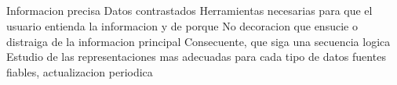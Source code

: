 \subsection*{}
Informacion precisa
Datos contrastados
Herramientas necesarias para que el usuario entienda la informacion y de porque
No decoracion que ensucie o distraiga de la informacion principal
Consecuente, que siga una secuencia logica
Estudio de las representaciones mas adecuadas para cada tipo de datos
fuentes fiables, actualizacion periodica
